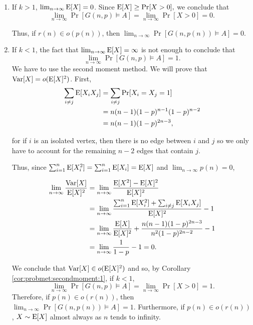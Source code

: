 \begin{enumerate}
    \item If $k > 1$, $\lim_{n \to \infty} \mathrm{E}[X] = 0$. Since \(\mathrm{E}[X] \geq \mathrm{Pr}[X > 0],\) we conclude that \[\lim_{n \to \infty} \Pr[G(n, p) \vDash A] =  \lim_{n \to \infty} \Pr[X > 0] = 0.\] \par
    Thus, if $r(n) \in o(p(n))$, then $\lim_{n \to \infty} \Pr[G(n, p(n)) \vDash A] = 0$. \par
    \item If $k < 1$, the fact that $\lim_{n \to \infty} \mathrm{E}[X] = \infty$ is not enough to conclude that \[\lim_{n \to \infty} \Pr[G(n, p) \vDash A] = 1.\] 
    We have to use the second moment method.  We will prove that $\mathrm{Var} [X] = o(\mathrm{E}[X]^2)$. First, 
    \begin{align*}
        \sum_{i \neq j}\mathrm{E}[X_iX_j] &= \sum_{i \neq j} \mathrm{Pr}[X_i = X_j = 1] \\
        &= n(n - 1)(1 - p)^{n -1}(1 - p)^{n - 2} \\ &= n(n - 1)(1 - p)^{2n - 3},
    \end{align*}
    
    for if $i$ is an isolated vertex, then there is no edge between $i$ and $j$ so we only have to account for the remaining $n - 2$ edges that contain $j$.  \par
    
    Thus, since $\sum_{i = 1}^{n}\mathrm{E}[X_i^2] =  \sum_{i = 1}^n \mathrm{E}[X_i] = \mathrm{E}[X]$ and $\lim_{n \to \infty} p(n) = 0$,
    
    \begin{align*}
        \lim_{n \to \infty} \frac{\mathrm{Var}[X]}{\mathrm{E}[X]^2} &= 
        \lim_{n \to \infty}\frac{\mathrm{E}[X^2] - \mathrm{E}[X]^2}{\mathrm{E}[X]^2} \\
        &= \lim_{n \to \infty} \frac{\sum_{i = 1}^n \mathrm{E}[X_i^2] + \sum_{i \neq j}\mathrm{E}[X_iX_j]}{\mathrm{E}[X]^2} - 1 \\ &= \lim_{n \to \infty} \frac{\mathrm{E}[X]}{\mathrm{E}[X]^2} +\frac{ n(n - 1)(1 - p)^{2n - 3}}{n^2(1 - p)^{2n - 2}} - 1 \\
        & = \lim_{n \to \infty} \frac{1}{1 - p} - 1 = 0.\\
    \end{align*} \par
    We conclude that $\mathrm{Var}[X] \in o(\mathrm{E}[X]^2)$ and so, by Corollary \ref{cor:probmet:secondmoment:1}, if $k < 1$, 
    \[\lim_{n \to \infty} \Pr[G(n, p) \vDash A] = \lim_{n \to \infty} \Pr[X > 0] = 1.\] 
    Therefore, if $p(n) \in o(r(n))$, then $\lim_{n \to \infty} \Pr[G(n, p(n)) \vDash A] = 1$. Furthermore, if $p(n) \in o(r(n))$, $X \sim \mathrm{E}[X]$ almost always as $n$ tends to infinity.  \par
\end{enumerate}

